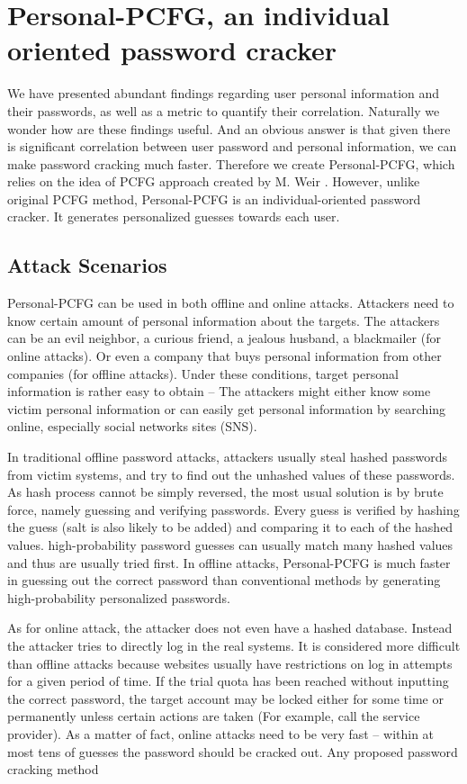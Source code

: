\documentclass{sig-alternate}
\begin{document}
\section{Personal-PCFG, an individual oriented password cracker}
\label{personalpcfg}
We have presented abundant findings regarding user personal information and their passwords, as well as a metric to quantify their correlation. Naturally we wonder how are these findings useful. And an obvious answer is that given there is significant correlation between user password and personal information, we can make password cracking much faster. Therefore we create Personal-PCFG, which relies on the idea of PCFG approach created by M. Weir \cite{weir2009password}. However, unlike original PCFG method, Personal-PCFG is an individual-oriented password cracker. It generates personalized guesses towards each user.

\subsection{Attack Scenarios}
Personal-PCFG can be used in both offline and online attacks. Attackers need to know certain amount of personal information about the targets. The attackers can be an evil neighbor, a curious friend, a jealous husband, a blackmailer (for online attacks). Or even a company that buys personal information from other companies (for offline attacks). Under these conditions, target personal information is rather easy to obtain -- The attackers might either know some victim personal information or can easily get personal information by searching online, especially social networks sites (SNS). 

In traditional offline password attacks, attackers usually steal hashed passwords from victim systems, and try to find out the unhashed values of these passwords. As hash process cannot be simply reversed, the most usual solution is by brute force, namely guessing and verifying passwords. Every guess is verified by hashing the guess (salt is also likely to be added) and comparing it to each of the hashed values. high-probability password guesses can usually match many hashed values and thus are usually tried first. In offline attacks, Personal-PCFG is much faster in guessing out the correct password than conventional methods by generating high-probability personalized passwords.

As for online attack, the attacker does not even have a hashed database. Instead the attacker tries to directly log in the real systems. It is considered more difficult than offline attacks because websites usually have restrictions on log in attempts for a given period of time. If the trial quota has been reached without inputting the correct password, the target account may be locked either for some time or permanently unless certain actions are taken (For example, call the service provider). As a matter of fact, online attacks need to be very fast -- within at most tens of guesses the password should be cracked out. Any proposed password cracking method 
\end{document}
